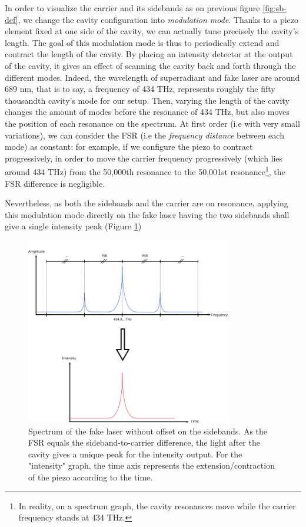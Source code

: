 \documentclass[11pt]{report}
\begin{document}
In order to visualize the carrier and its sidebands as on previous figure \ref{fig:sb-def}, we change the cavity configuration into \textit{modulation mode}. Thanks to a piezo element fixed at one side of the cavity, we can actually tune precisely the cavity's length. The goal of this modulation mode is thus to periodically extend and contract the length of the cavity. By placing an intensity detector at the output of the cavity, it gives an effect of scanning the cavity back and forth through the different modes. Indeed, the wavelength of superradiant and fake laser are around 689 nm, that is to say, a frequency of 434 THz, represents roughly the fifty thousandth cavity's mode for our setup. Then, varying the length of the cavity changes the amount of modes before the resonance of 434 THz, but also moves the position of each resonance on the spectrum. At first order (i.e with very small variations), we can consider the FSR (i.e the \textit{frequency distance} between each mode) as constant: for example, if we configure the piezo to contract progressively, in order to move the carrier frequency progressively (which lies around 434 THz) from the 50,000th resonance to the 50,001st resonance\footnote{In reality, on a spectrum graph, the cavity resonances move while the carrier frequency stands at 434 THz.}, the FSR difference is negligible.

Nevertheless, as both the sidebands and the carrier are on resonance, applying this modulation mode directly on the fake laser having the two sidebands shall give a single intensity peak (Figure \ref{fig:sb-fsr})

\begin{figure}[h!]
\centering
\includegraphics[width=0.8\textwidth]{sb-fsr}
\caption{Spectrum of the fake laser without offset on the sidebands. As the FSR equals the sideband-to-carrier difference, the light after the cavity gives a unique peak for the intensity output. For the "intensity" graph, the time axis represents the extension/contraction of the piezo according to the time.}
\label{fig:sb-fsr}
\end{figure}
\end{document}
